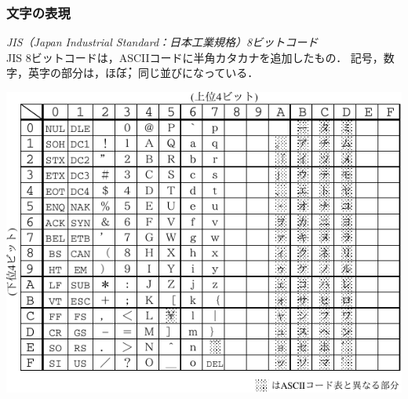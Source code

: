 \documentclass[handout]{beamer}        %
\begin{document}
\begin{frame}
  \frametitle{文字の表現}
  \emph{JIS（Japan Industrial Standard：日本工業規格）8ビットコード}\\
  JIS 8ビットコードは，ASCIIコードに半角カタカナを追加したもの．
  記号，数字，英字の部分は，\.ほ\.ぼ，同じ並びになっている．

  \centerline{\includegraphics[scale=0.85]{../chap2/jisx0201.pdf}}

\end{frame}
\end{document}
